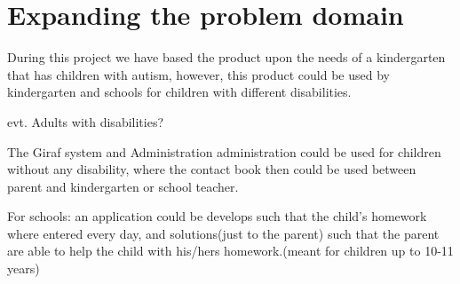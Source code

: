 \section{Expanding the problem domain}

During this project we have based the product upon the needs of a kindergarten that has children with autism, however, this product could be used by kindergarten and schools for children with different disabilities.

evt. Adults with disabilities?

The Giraf system and Administration administration could be used for children without any disability, where the contact book then could be used between parent and kindergarten or school teacher. 

For schools: an application could be develops such that the child's homework where entered every day, and solutions(just to the parent) such that the parent are able to help the child with his/hers homework.(meant for children up to 10-11 years)

    
